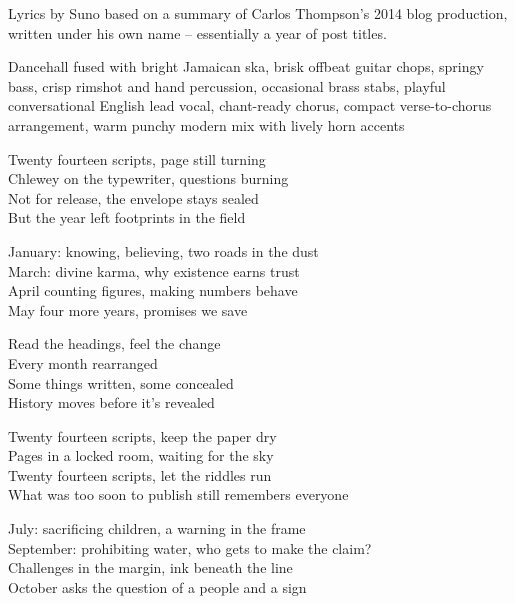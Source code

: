 
\label{sec:twenty-fourteen-scripts}
\begin{notes}
Lyrics by Suno based on a summary of Carlos Thompson's 2014 blog production, written under his own name -- essentially a year of post titles.
\end{notes}
\begin{style}
Dancehall fused with bright Jamaican ska, brisk offbeat guitar chops, springy bass, crisp rimshot and hand percussion, occasional brass stabs, playful conversational English lead vocal, chant-ready chorus, compact verse-to-chorus arrangement, warm punchy modern mix with lively horn accents
\end{style}
\begin{lyrics}
Twenty fourteen scripts, page still turning\\
Chlewey on the typewriter, questions burning\\
Not for release, the envelope stays sealed\\
But the year left footprints in the field

January: knowing, believing, two roads in the dust\\
March: divine karma, why existence earns trust\\
April counting figures, making numbers behave\\
May four more years, promises we save

Read the headings, feel the change\\
Every month rearranged\\
Some things written, some concealed\\
History moves before it's revealed

Twenty fourteen scripts, keep the paper dry\\
Pages in a locked room, waiting for the sky\\
Twenty fourteen scripts, let the riddles run\\
What was too soon to publish still remembers everyone

July: sacrificing children, a warning in the frame\\
September: prohibiting water, who gets to make the claim?\\
Challenges in the margin, ink beneath the line\\
October asks the question of a people and a sign


\end{lyrics}

